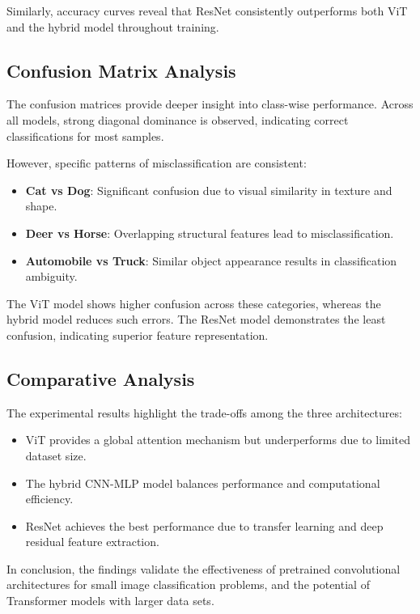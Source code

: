 \documentclass[conference]{IEEEtran}
\begin{document}
Similarly, accuracy curves reveal that ResNet consistently outperforms both ViT and the hybrid model throughout training.

\subsection{Confusion Matrix Analysis}

The confusion matrices provide deeper insight into class-wise performance. Across all models, strong diagonal dominance is observed, indicating correct classifications for most samples.

However, specific patterns of misclassification are consistent:

\begin{itemize}
    \item \textbf{Cat vs Dog}: Significant confusion due to visual similarity in texture and shape.
    \item \textbf{Deer vs Horse}: Overlapping structural features lead to misclassification.
    \item \textbf{Automobile vs Truck}: Similar object appearance results in classification ambiguity.
\end{itemize}

The ViT model shows higher confusion across these categories, whereas the hybrid model reduces such errors. The ResNet model demonstrates the least confusion, indicating superior feature representation.

\subsection{Comparative Analysis}

The experimental results highlight the trade-offs among the three architectures:

\begin{itemize}
    \item ViT provides a global attention mechanism but underperforms due to limited dataset size.
    \item The hybrid CNN-MLP model balances performance and computational efficiency.
    \item ResNet achieves the best performance due to transfer learning and deep residual feature extraction.
\end{itemize}

In conclusion, the findings validate the effectiveness of pretrained convolutional architectures for small image classification problems, and the potential of Transformer models with larger data sets.
\end{document}
